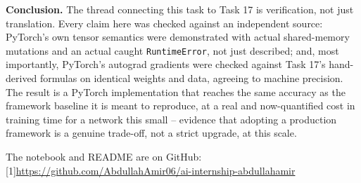 \documentclass[11pt,a4paper]{article}
\begin{document}
\textbf{Conclusion.} The thread connecting this task to Task 17 is verification, not
just translation. Every claim here was checked against an independent source: PyTorch's
own tensor semantics were demonstrated with actual shared-memory mutations and an actual
caught \texttt{RuntimeError}, not just described; and, most importantly, PyTorch's
autograd gradients were checked against Task 17's hand-derived formulas on identical
weights and data, agreeing to machine precision. The result is a PyTorch implementation
that reaches the same accuracy as the framework baseline it is meant to reproduce, at a
real and now-quantified cost in training time for a network this small -- evidence that
adopting a production framework is a genuine trade-off, not a strict upgrade, at this
scale.

\vspace{0.4cm}
\noindent The notebook and README are on GitHub: {\small\scalebox{0.72}[1]{\url{https://github.com/AbdullahAmir06/ai-internship-abdullahamir}}}
\end{document}
